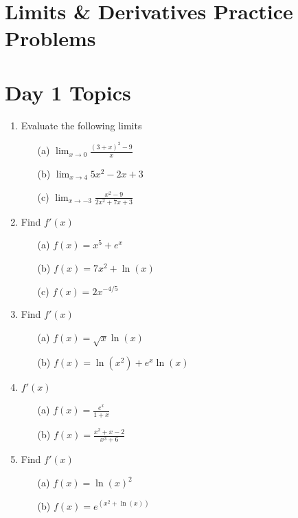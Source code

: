 \documentclass[11pt]{article}
\begin{document}
\section*{Limits \& Derivatives Practice Problems}

\section*{Day 1 Topics}

\begin{enumerate} 

\item Evaluate the following limits

\begin{itemize}
    \item[(a)] \(\lim_{x \to 0} \frac{(3 + x)^2 - 9}{x}\)
    \item[(b)] \(\lim_{x \to 4} 5x^2 - 2x + 3\)
    \item[(c)] \(\lim_{x \to -3} \frac{x^2 - 9}{2x^2 + 7x + 3}\)
\end{itemize}

\item Find \( f'(x) \)

\begin{itemize}
    \item[(a)] \( f(x) = x^5 + e^x \)
    \item[(b)] \( f(x) = 7x^2 + \ln(x) \)
    \item[(c)] \( f(x) = 2x^{-4/5} \)
\end{itemize}


\item Find \( f'(x) \)

\begin{itemize}
    \item[(a)] \( f(x) = \sqrt{x} \ln(x) \)
    \item[(b)] \( f(x) = \ln(x^2) + e^x \ln(x) \)
\end{itemize}

\item \( f'(x) \)

\begin{itemize}
    \item[(a)] \( f(x) = \frac{e^x}{1 + x} \)
    \item[(b)] \( f(x) = \frac{x^2 + x - 2}{x^3 + 6} \)
\end{itemize}

\item Find \( f'(x) \)

\begin{itemize}
    \item[(a)] \( f(x) = \ln(x)^2 \)
    \item[(b)] \( f(x) = e^{(x^2 + \ln(x))} \)
\end{itemize}


\end{enumerate}
\end{document}
